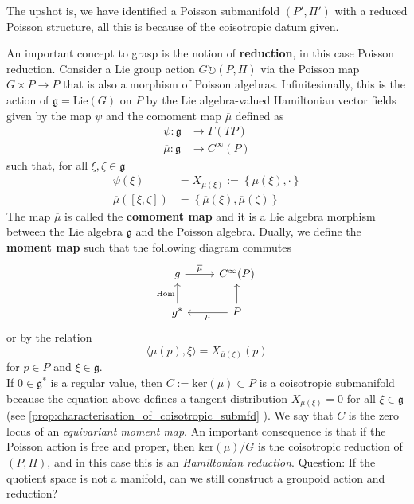 The upshot is, we have identified a Poisson submanifold $(P', \Pi')$ with a reduced Poisson structure, all this is because of the coisotropic datum given.



An important concept to grasp is the notion of \textbf{reduction}, in this case Poisson reduction.
Consider a Lie group action $G \circlearrowright (P, \Pi)$ via the Poisson map $G \times P \rightarrow P$ that is also a morphism of Poisson algebras. 
Infinitesimally, this is the action of $\mathfrak{g} = \mathrm{Lie}(G)$ on $P$ by the Lie algebra-valued Hamiltonian vector fields given by the map $\psi$ and the comoment map $\overline{\mu}$ defined as
\begin{align*}
\psi: \mathfrak{g} &\rightarrow \Gamma(TP)\\
\overline{\mu} : \mathfrak{g} & \rightarrow C^\infty(P)
\end{align*}
such that, for all $\xi,\zeta \in \mathfrak{g}$
\begin{align}
\psi(\xi) &= X_{\overline{\mu}(\xi)} := \left\{ \overline{\mu}(\xi), \cdot \right\}    \\
    \overline{\mu}([\xi, \zeta]) &= \left\{ \overline{\mu}(\xi), \overline{\mu}(\zeta) \right\}
\end{align}
The map $\overline{\mu}$ is called the \textbf{comoment map} and it is a Lie algebra morphism between the Lie algebra $\mathfrak{g}$ and the Poisson algebra.
Dually, we define the \textbf{moment map} such that the following diagram commutes
\begin{equation}
    \begin{tikzcd}
        g \arrow["\overline{\mu}"]{r}&C^\infty(P)\\
        g^* \arrow["\mathrm{Hom}"]{u}&P \arrow[]{u} \arrow["\mu"]{l}
    \end{tikzcd}
\end{equation}
or by the relation
\begin{equation}
    \langle \mu(p), \xi \rangle = X_{\overline{\mu}(\xi)}(p)
\end{equation}
for $p \in P$ and $\xi \in \mathfrak{g}$.\\
% 
If $0 \in \mathfrak{g}^*$ is a regular value, then $C := \mathrm{ker}(\mu) \subset P$ is a coisotropic submanifold because the equation above defines a tangent distribution $X_{\overline{\mu}(\xi)} = 0$ for all $\xi \in \mathfrak{g}$ (see \cref{prop:characterisation_of_coisotropic_submfd} ).
We say that $C$ is the zero locus of an \textit{equivariant moment map}.
% 
An important consequence is that if the Poisson action is free and proper, then $\mathrm{ker}(\mu)/G$ is the coisotropic reduction of $(P, \Pi)$, and in this case this is an \textit{Hamiltonian reduction}.
% 
Question:
    If the quotient space is not a manifold, can we still construct a groupoid action and reduction?
% 
